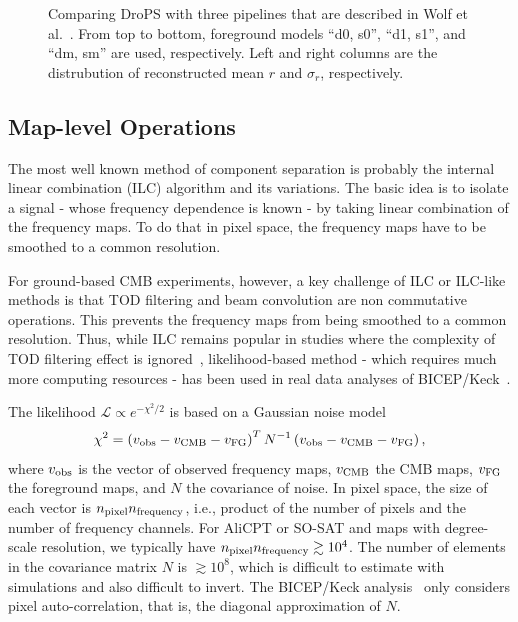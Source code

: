 \documentclass[12pt, a4paper]{ctexart} %
\begin{document}
\begin{figure}
  \caption{Comparing DroPS with three pipelines that are described in Wolf et al.~\cite{SO-SAT}. From top to bottom, foreground models ``d0, s0'', ``d1, s1'', and ``dm, sm'' are used, respectively. Left and right columns are the distrubution of reconstructed mean $r$ and $\sigma_r$, respectively.\label{fig:compare_SO}}
\end{figure}

\subsection{Map-level Operations}

The most well known method of component separation is probably the internal linear combination (ILC) algorithm and its variations. The basic idea is to isolate a signal - whose frequency dependence is known - by taking linear combination of the frequency maps. To do that in pixel space, the frequency maps have to be smoothed to a common resolution. 

For ground-based CMB experiments, however, a key challenge of ILC or ILC-like methods is that TOD filtering and beam convolution are non commutative operations. This prevents the frequency maps from being smoothed to a common resolution. Thus, while ILC remains popular in studies where the complexity of TOD filtering effect is ignored~\cite{SO-SAT}, likelihood-based method - which requires much more computing resources - has been used in real data analyses of BICEP/Keck~\cite{BKmap}.


The likelihood $\mathcal{L}\propto e^{-\chi^2/2}$ is based on a Gaussian noise model
\begin{equation}
  \chi^2 = \left(v_{\rm obs} - v_{\rm CMB} - v_{\rm FG}\right)^TN^{-1}\left(v_{\rm obs} - v_{\rm CMB} - v_{\rm FG}\right),
\end{equation}
where $v_{\rm obs}$ is the vector of observed frequency maps, $v_{\rm CMB}$ the CMB maps, $v_{\rm FG}$ the foreground maps, and $N$ the covariance of noise. In pixel space, the size of each vector is $n_{\rm pixel} n_{\rm frequency}$, i.e., product of the number of pixels and the number of frequency channels. For AliCPT or SO-SAT and maps with degree-scale resolution, we typically have $n_{\rm pixel} n_{\rm frequency} \gtrsim 10^4$. The number of elements in the covariance matrix $N$ is $\gtrsim 10^8$, which is difficult to estimate with simulations and also difficult to invert. The BICEP/Keck analysis~\cite{BKmap} only considers pixel auto-correlation, that is, the diagonal approximation of $N$.
\end{document}
